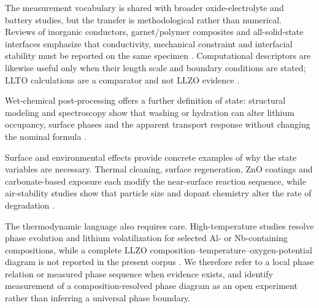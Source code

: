 The measurement vocabulary is shared with broader oxide-electrolyte and battery studies, but the transfer is methodological rather than numerical. Reviews of inorganic conductors, garnet/polymer composites and all-solid-state interfaces emphasize that conductivity, mechanical constraint and interfacial stability must be reported on the same specimen \cite{ohno2020materials,abakumov2020solid,reddy2020sulfide,li2020status,guo2022solid,ma2023a,he2024solid}. Computational descriptors are likewise useful only when their length scale and boundary conditions are stated; LLTO calculations are a comparator and not LLZO evidence \cite{wang2025computational,li2024machine,burov2026machine}.

Wet-chemical post-processing offers a further definition of state: structural modeling and spectroscopy show that washing or hydration can alter lithium occupancy, surface phases and the apparent transport response without changing the nominal formula \cite{kun2018structural,han2023fast}.

Surface and environmental effects provide concrete examples of why the state variables are necessary. Thermal cleaning, surface regeneration, ZnO coatings and carbonate-based exposure each modify the near-surface reaction sequence, while air-stability studies show that particle size and dopant chemistry alter the rate of degradation \cite{benabed2023solving,vema2023understanding,mohammadi2023surface,garcia2026insights,watanabe2026chemical,hoinkis2023particle,zhao2025air}.

The thermodynamic language also requires care. High-temperature studies resolve phase evolution and lithium volatilization for selected Al- or Nb-containing compositions, while a complete LLZO composition--temperature--oxygen-potential diagram is not reported in the present corpus \cite{gullbrekken2025phase,montoya2024lithium,luo2025phase,li2026structure}. We therefore refer to a local phase relation or measured phase sequence when evidence exists, and identify measurement of a composition-resolved phase diagram as an open experiment rather than inferring a universal phase boundary.
